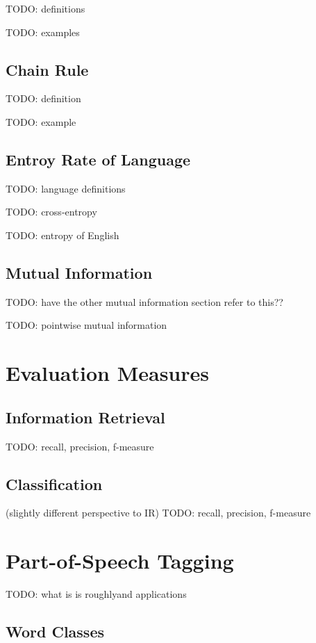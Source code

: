 \documentclass{article}
\begin{document}
TODO: definitions

TODO: examples

\subsection{Chain Rule}

TODO: definition

TODO: example

\subsection{Entroy Rate of Language}

TODO: language definitions

TODO: cross-entropy

TODO: entropy of English

\subsection{Mutual Information}

TODO: have the other mutual information section refer to this??

TODO: pointwise mutual information

\section{Evaluation Measures}

\subsection{Information Retrieval}

TODO: recall, precision, f-measure

\subsection{Classification}

(slightly different perspective to IR)
TODO: recall, precision, f-measure

\section{Part-of-Speech Tagging}

TODO: what is is roughlyand applications

\subsection{Word Classes}
\end{document}
